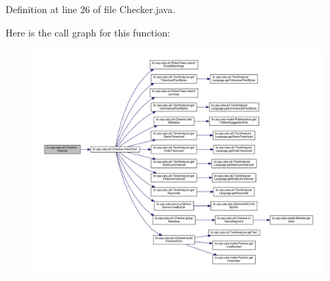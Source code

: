 Definition at line 26 of file Checker.\+java.



Here is the call graph for this function\+:\nopagebreak
\begin{figure}[H]
\begin{center}
\leavevmode
\includegraphics[width=350pt]{classbr_1_1usp_1_1cata_1_1util_1_1_checker_ae9812a1e6e521013d694d91f3ca1e4c8_cgraph}
\end{center}
\end{figure}




